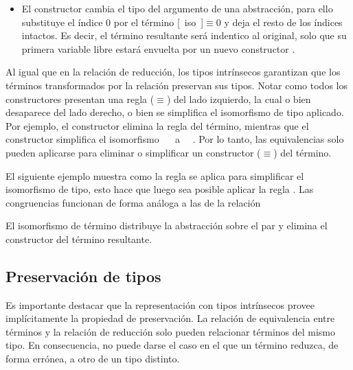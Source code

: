 \begin{itemize}
	\item El constructor  cambia el tipo del argumento de una abstracción, para ello substituye el índice 0 por el término [~iso~]$\equiv0$ y deja el resto de los índices intactos.
	Es decir, el término resultante será indentico al original, solo que su primera variable libre estará envuelta por un nuevo constructor \const{[\_]$\equiv$\_}.
\end{itemize}

Al igual que en la relación de reducción, los tipos intrínsecos garantizan que los términos transformados por la relación \type{$\_\rightleftarrows\_$} preservan sus tipos.
Notar como todos los constructores presentan una regla ($\equiv$) del lado izquierdo, la cual o bien desaparece del lado derecho, o bien se simplifica el isomorfismo de tipo aplicado.
Por ejemplo, el constructor  elimina la regla \const{[ comm ]$\equiv$\_} del término, mientras que el constructor  simplifica el isomorfismo \const{[ cong$\Rightarrow_2$}~~\const{]$\equiv$\_} a \const{[}~~\const{]$\equiv$\_}.
Por lo tanto, las equivalencias solo pueden aplicarse para eliminar o simplificar un constructor ($\equiv$) del término.

\begin{example}
	El siguiente ejemplo muestra como la regla  se aplica para simplificar el isomorfismo de tipo, esto hace que luego sea posible aplicar la regla .
	Las congruencias funcionan de forma análoga a las de la relación \type{$\_\hookrightarrow\_$}
\end{example}

\begin{example}
	El isomorfismo de término  distribuye la abstracción sobre el par y elimina el constructor  del término resultante.
\end{example}

\subsection{Preservación de tipos}

Es importante destacar que la representación con tipos intrínsecos provee implícitamente la propiedad de preservación.
La relación de equivalencia entre términos \type{$\_\rightleftarrows\_$} y la relación de reducción \type{$\_\hookrightarrow\_$} solo pueden relacionar términos del mismo tipo. 
En consecuencia, no puede darse el caso en el que un término reduzca, de forma errónea, a otro de un tipo distinto.


